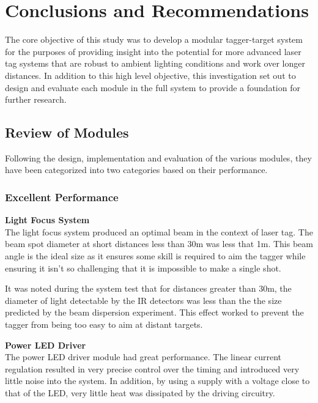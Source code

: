 \chapter{Conclusions and Recommendations}
\label{ch_conclusions}



The core objective of this study was to develop a modular tagger-target system for the purposes of providing insight into the potential for more advanced laser tag systems that are robust to ambient lighting conditions and work over longer distances. In addition to this high level objective, this investigation set out to design and evaluate each module in the full system to provide a foundation for further research.

\section{Review of Modules}
Following the design, implementation and evaluation of the various modules, they have been categorized into two categories based on their performance. %

\subsection{Excellent Performance}

\textbf{Light Focus System}\\
The light focus system produced an optimal beam in the context of laser tag. The beam spot diameter at short distances less than 30m was less that 1m. This beam angle is the ideal size as it ensures some skill is required to aim the tagger while ensuring it isn't so challenging that it is impossible to make a single shot.

It was noted during the system test that for distances greater than 30m, the diameter of light detectable by the IR detectors was less than the the size predicted by the beam dispersion experiment. This effect worked to prevent the tagger from being too easy to aim at distant targets.

\textbf{Power LED Driver}\\
The power LED driver module had great performance. The linear current regulation resulted in very precise control over the timing and introduced very little noise into the system. In addition, by using a supply with a voltage close to that of the LED, very little heat was dissipated by the driving circuitry.

